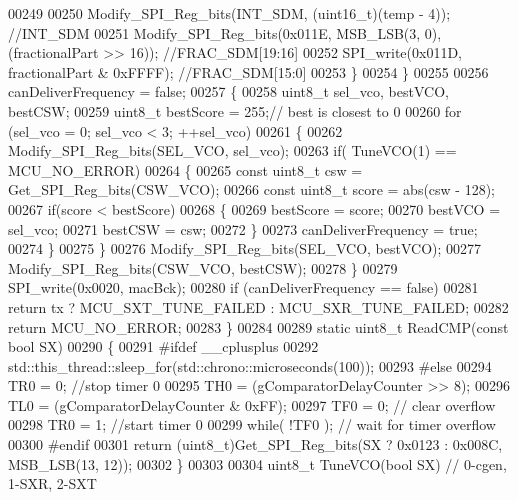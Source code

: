 \begin{DoxyCode}
00249 
00250             Modify_SPI_Reg_bits(INT_SDM, (uint16\_t)(temp - 4)); \textcolor{comment}{//INT\_SDM}
00251             Modify_SPI_Reg_bits(0x011E, MSB_LSB(3, 0), (fractionalPart >> 16)); \textcolor{comment}{//FRAC\_SDM[19:16]}
00252             SPI_write(0x011D, fractionalPart & 0xFFFF); \textcolor{comment}{//FRAC\_SDM[15:0]}
00253         \}
00254     \}
00255 
00256     canDeliverFrequency = \textcolor{keyword}{false};
00257     \{
00258         uint8\_t sel\_vco, bestVCO, bestCSW;
00259         uint8\_t bestScore = 255;\textcolor{comment}{// best is closest to 0}
00260         \textcolor{keywordflow}{for} (sel\_vco = 0; sel\_vco < 3; ++sel\_vco)
00261         \{
00262             Modify_SPI_Reg_bits(SEL_VCO, sel\_vco);
00263             \textcolor{keywordflow}{if}( TuneVCO(1) == MCU_NO_ERROR)
00264             \{
00265                 \textcolor{keyword}{const} uint8\_t csw = Get_SPI_Reg_bits(CSW_VCO);
00266                 \textcolor{keyword}{const} uint8\_t score = abs(csw - 128);
00267                 \textcolor{keywordflow}{if}(score < bestScore)
00268                 \{
00269                     bestScore = score;
00270                     bestVCO = sel\_vco;
00271                     bestCSW = csw;
00272                 \}
00273                 canDeliverFrequency = \textcolor{keyword}{true};
00274             \}
00275         \}
00276         Modify_SPI_Reg_bits(SEL_VCO, bestVCO);
00277         Modify_SPI_Reg_bits(CSW_VCO, bestCSW);
00278     \}
00279     SPI_write(0x0020, macBck);
00280     \textcolor{keywordflow}{if} (canDeliverFrequency == \textcolor{keyword}{false})
00281         \textcolor{keywordflow}{return} tx ? MCU_SXT_TUNE_FAILED : MCU_SXR_TUNE_FAILED;
00282     \textcolor{keywordflow}{return} MCU_NO_ERROR;
00283 \}
00284 
00289 \textcolor{keyword}{static} uint8\_t ReadCMP(\textcolor{keyword}{const} \textcolor{keywordtype}{bool} SX)
00290 \{
00291 \textcolor{preprocessor}{#ifdef \_\_cplusplus}
00292     std::this\_thread::sleep\_for(std::chrono::microseconds(100));
00293 \textcolor{preprocessor}{#else}
00294     TR0 = 0; \textcolor{comment}{//stop timer 0}
00295     TH0 = (gComparatorDelayCounter >> 8);
00296     TL0 = (gComparatorDelayCounter & 0xFF);
00297     TF0 = 0; \textcolor{comment}{// clear overflow}
00298     TR0 = 1; \textcolor{comment}{//start timer 0}
00299     \textcolor{keywordflow}{while}( !TF0 ); \textcolor{comment}{// wait for timer overflow}
00300 \textcolor{preprocessor}{#endif}
00301     \textcolor{keywordflow}{return} (uint8\_t)Get_SPI_Reg_bits(SX ? 0x0123 : 0x008C, MSB_LSB(13, 12));
00302 \}
00303 
00304 uint8\_t TuneVCO(\textcolor{keywordtype}{bool} SX) \textcolor{comment}{// 0-cgen, 1-SXR, 2-SXT}

\end{DoxyCode}
